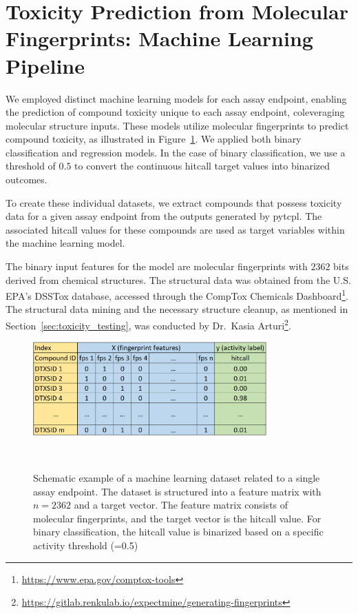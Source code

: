 \section{Toxicity Prediction from Molecular Fingerprints: Machine Learning Pipeline}
We employed distinct machine learning models for each assay endpoint, enabling the prediction of compound toxicity unique to each assay endpoint, coleveraging molecular structure inputs.
These models utilize molecular fingerprints to predict compound toxicity, as illustrated in Figure~\ref{fig:ml_dataset}. We applied both binary classification and regression models. In the case of binary classification, we use a threshold of $0.5$ to convert the continuous hitcall target values into binarized outcomes.

To create these individual datasets, we extract compounds that possess toxicity data for a given assay endpoint from the outputs generated by pytcpl. The associated hitcall values for these compounds are used as target variables within the machine learning model.

The binary input features for the model are molecular fingerprints with $2362$ bits derived from chemical structures. The structural data was obtained from the U.S. EPA's DSSTox database, accessed through the CompTox Chemicals Dashboard\footnote{\url{https://www.epa.gov/comptox-tools}}. The structural data mining and the necessary structure cleanup, as mentioned in Section~\ref{sec:toxicity_testing}, was conducted by Dr.\ Kasia Arturi\footnote{\url{https://gitlab.renkulab.io/expectmine/generating-fingerprints}}.

\begin{figure} 
    \centering
    \includegraphics[width=0.8\textwidth]{figures/ml_dataset.png}
    \caption{Schematic example of a machine learning dataset related to a single assay endpoint. The dataset is structured into a feature matrix with $n=2362$ and a target vector. The feature matrix consists of molecular fingerprints, and the target vector is the hitcall value. For binary classification, the hitcall value is binarized based on a specific activity threshold (=0.5)}
~\label{fig:ml_dataset}
\end{figure}


